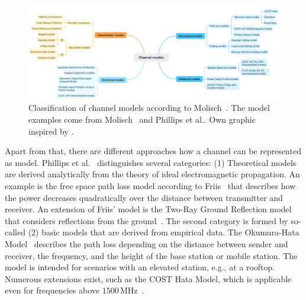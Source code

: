 \begin{figure}[hbt!]
\includegraphics[width=1.0\textwidth]{../figures/state-of-the-art/mobilecommunication/channelmodelv2.png} 
\caption{Classification of channel models according to Molisch~\cite{molisch-2011-com}. The model examples come from Molisch~\cite{molisch-2011-com} and Phillips et al.\cite{phillips-2013-com}. Own graphic inspired by \cite{molisch-2011-com,phillips-2013-com}.}
\label{fig:pathlossmodelsoverview}
\end{figure}

Apart from that, there are different approaches how a channel can be represented as model. Phillips et al.~\cite{phillips-2013-com} distinguishes several categories: (1) Theoretical models are derived analytically from the theory of ideal electromagnetic propagation. An example is the free space path loss model according to Friis~\cite{friis-1946-com} that describes how the power decreases quadratically over the distance between transmitter and receiver. An extension of Friis' model is the Two-Ray Ground Reflection model that considers reflections from the ground~\cite[p.95]{rappaport-2001-com}. 
%
The second category is formed by so-called (2) basic models that are derived from empirical data. 
The Okumura-Hata Model~\cite{okumura-1968-com} describes the path loss depending on the distance between sender and receiver, the frequency, and the height of the base station or mobile station. The model is intended for scenarios with an elevated station, e.g., at a rooftop. Numerous extensions exist, such as the COST Hata Model, which is applicable even for frequencies above $1500\,$MHz~\cite{hata-2023-com}. 


